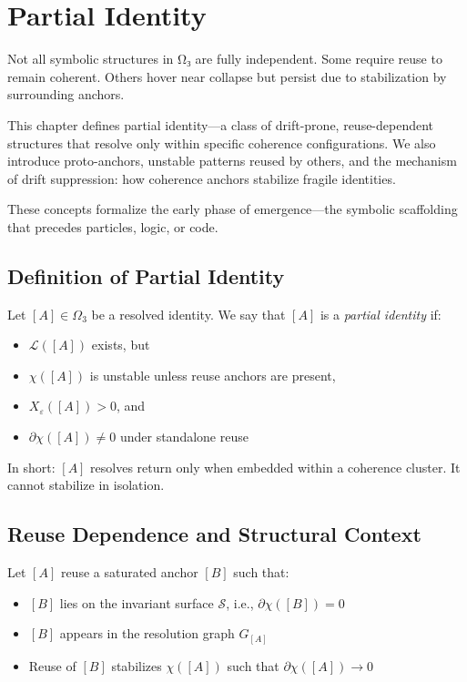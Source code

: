 \chapter{Partial Identity}

Not all symbolic structures in Ω₃ are fully independent. Some require
reuse to remain coherent. Others hover near collapse but persist due to
stabilization by surrounding anchors.

This chapter defines partial identity---a class of drift-prone,
reuse-dependent structures that resolve only within specific coherence
configurations. We also introduce proto-anchors, unstable patterns
reused by others, and the mechanism of drift suppression: how coherence
anchors stabilize fragile identities.

These concepts formalize the early phase of emergence---the symbolic
scaffolding that precedes particles, logic, or code.

\section{Definition of Partial Identity} \label{definition-of-partial-identity}

\begin{definition} \label{def:partial-identity}
Let $[A] \in \Omega_3$ be a resolved identity.  
We say that $[A]$ is a \emph{partial identity} if:
\begin{itemize}
  \item $\mathcal{L}([A])$ exists, but
  \item $\chi([A])$ is unstable unless reuse anchors are present,
  \item $X_\varepsilon([A]) > 0$, and
  \item $\partial \chi([A]) \ne 0$ under standalone reuse
\end{itemize}
In short: $[A]$ resolves return only when embedded within a coherence cluster.  
It cannot stabilize in isolation.
\end{definition}

\section{Reuse Dependence and Structural Context} \label{reuse-dependence-and-structural-context}

Let $[A]$ reuse a saturated anchor $[B]$ such that:

\begin{itemize}
  \item $[B]$ lies on the invariant surface $\mathcal{S}$, i.e., $\partial \chi([B]) = 0$
  \item $[B]$ appears in the resolution graph $G_{[A]}$
  \item Reuse of $[B]$ stabilizes $\chi([A])$ such that $\partial \chi([A]) \rightarrow 0$
\end{itemize}

